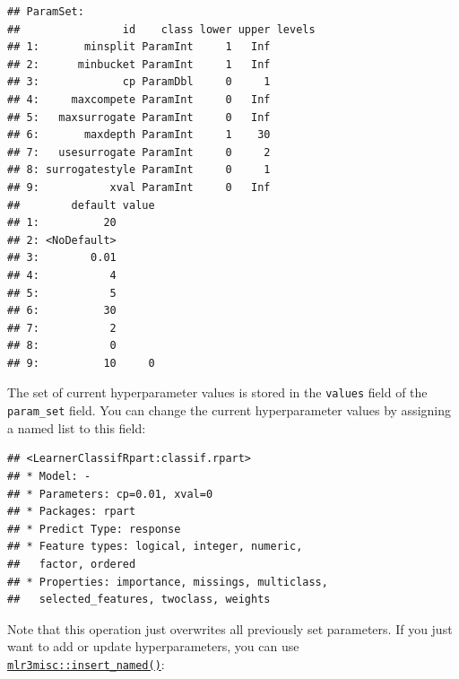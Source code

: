 \documentclass[]{article}
\newenvironment{Shaded}{\begin{snugshade}}{\end{snugshade}}
\newcommand{\DataTypeTok}[1]{\textcolor[rgb]{0.13,0.29,0.53}{#1}}
\newcommand{\DecValTok}[1]{\textcolor[rgb]{0.00,0.00,0.81}{#1}}
\newcommand{\FloatTok}[1]{\textcolor[rgb]{0.00,0.00,0.81}{#1}}
\newcommand{\KeywordTok}[1]{\textcolor[rgb]{0.13,0.29,0.53}{\textbf{#1}}}
\newcommand{\NormalTok}[1]{#1}
\newcommand{\OperatorTok}[1]{\textcolor[rgb]{0.81,0.36,0.00}{\textbf{#1}}}
\newcommand{\StringTok}[1]{\textcolor[rgb]{0.31,0.60,0.02}{#1}}
\renewenvironment{Shaded} {\begin{snugshade}\small} {\end{snugshade}}
\begin{document}
\begin{Shaded}
\end{Shaded}

\begin{verbatim}
## ParamSet: 
##                id    class lower upper levels
## 1:       minsplit ParamInt     1   Inf       
## 2:      minbucket ParamInt     1   Inf       
## 3:             cp ParamDbl     0     1       
## 4:     maxcompete ParamInt     0   Inf       
## 5:   maxsurrogate ParamInt     0   Inf       
## 6:       maxdepth ParamInt     1    30       
## 7:   usesurrogate ParamInt     0     2       
## 8: surrogatestyle ParamInt     0     1       
## 9:           xval ParamInt     0   Inf       
##        default value
## 1:          20      
## 2: <NoDefault>      
## 3:        0.01      
## 4:           4      
## 5:           5      
## 6:          30      
## 7:           2      
## 8:           0      
## 9:          10     0
\end{verbatim}

The set of current hyperparameter values is stored in the \texttt{values} field of the \texttt{param\_set} field.
You can change the current hyperparameter values by assigning a named list to this field:

\begin{Shaded}
\end{Shaded}

\begin{verbatim}
## <LearnerClassifRpart:classif.rpart>
## * Model: -
## * Parameters: cp=0.01, xval=0
## * Packages: rpart
## * Predict Type: response
## * Feature types: logical, integer, numeric,
##   factor, ordered
## * Properties: importance, missings, multiclass,
##   selected_features, twoclass, weights
\end{verbatim}

Note that this operation just overwrites all previously set parameters.
If you just want to add or update hyperparameters, you can use \href{https://mlr3misc.mlr-org.com/reference/insert_named.html}{\texttt{mlr3misc::insert\_named()}}:
\end{document}

